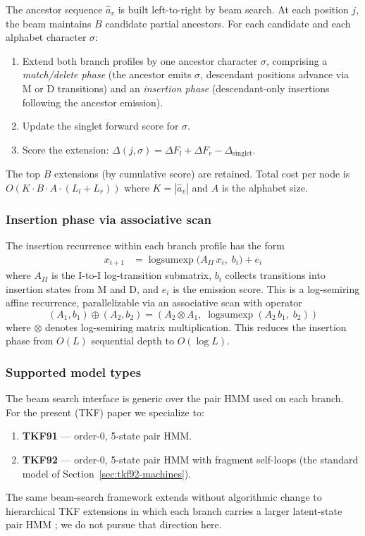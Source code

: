 The ancestor sequence $\hat{a}_v$ is built left-to-right by beam search.
At each position $j$, the beam maintains $B$ candidate partial ancestors.
For each candidate and each alphabet character $\sigma$:
\begin{enumerate}
\item Extend both branch profiles by one ancestor character $\sigma$,
  comprising a \emph{match/delete phase} (the ancestor emits $\sigma$,
  descendant positions advance via M or D transitions)
  and an \emph{insertion phase} (descendant-only insertions following the
  ancestor emission).
\item Update the singlet forward score for $\sigma$.
\item Score the extension:
  $\Delta(j, \sigma) = \Delta F_{l} + \Delta F_{r} - \Delta_{\mathrm{singlet}}$.
\end{enumerate}
The top $B$ extensions (by cumulative score) are retained.
Total cost per node is $O(K \cdot B \cdot A \cdot (L_l + L_r))$
where $K = |\hat{a}_v|$ and $A$ is the alphabet size.

\subsubsection{Insertion phase via associative scan}

The insertion recurrence within each branch profile has the form
\begin{align}
x_{i+1} &= \operatorname{logsumexp}\bigl(A_{II} \, x_i,\; b_i\bigr) + e_i
\label{eq:insert-recurrence}
\end{align}
where $A_{II}$ is the I-to-I log-transition submatrix, $b_i$ collects
transitions into insertion states from M and D, and $e_i$ is the emission score.
This is a log-semiring affine recurrence, parallelizable via
an associative scan with operator
\[
(A_1, b_1) \oplus (A_2, b_2) = (A_2 \otimes A_1,\; \operatorname{logsumexp}(A_2 \, b_1,\; b_2))
\]
where $\otimes$ denotes log-semiring matrix multiplication.
This reduces the insertion phase from $O(L)$ sequential depth to $O(\log L)$.

\subsubsection{Supported model types}

The beam search interface is generic over the pair HMM used on each branch.
For the present (TKF) paper we specialize to:
\begin{enumerate}
\item \textbf{TKF91} --- order-0, 5-state pair HMM.
\item \textbf{TKF92} --- order-0, 5-state pair HMM with fragment self-loops
  (the standard model of Section~\ref{sec:tkf92-machines}).
\end{enumerate}
The same beam-search framework extends without algorithmic change to
hierarchical TKF extensions in which each branch carries a
larger latent-state pair HMM \cite{LargeHolmes2026}; we
do not pursue that direction here.


